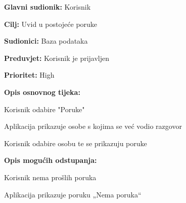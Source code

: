 \noindent {}
	\begin{packed_item}

		\item \textbf{Glavni sudionik: }Korisnik
		\item \textbf{Cilj:} Uvid u postojeće poruke
		\item \textbf{Sudionici:} Baza podataka
		\item \textbf{Preduvjet:} Korisnik je prijavljen
		\item \textbf{Prioritet:} High
		\item \textbf{Opis osnovnog tijeka:}
		
		\item[] \begin{packed_enum}

			\item Korisnik odabire "Poruke"
			\item Aplikacija prikazuje osobe s kojima se već vodio razgovor
			\item Korisnik odabire osobu te se prikazuju poruke
		\end{packed_enum}
	
		\item  \textbf{Opis mogućih odstupanja:}
	
		\item[] \begin{packed_item}

			\item[2.a] Korisnik nema prošlih poruka
			\item[] \begin{packed_enum}
				\item Aplikacija prikazuje poruku „Nema poruka“
			\end{packed_enum}
		\end{packed_item}
	\end{packed_item}


